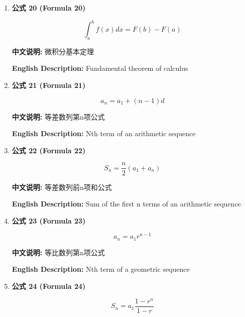 \documentclass[12pt,a4paper]{article}
\begin{document}
\begin{enumerate}[leftmargin=*]
\vspace{0.5cm}

\item \textbf{公式 20 (Formula 20)}

\begin{equation}
\int_a^b f(x)dx = F(b) - F(a)
\end{equation}

\textbf{中文说明:} 微积分基本定理

\textbf{English Description:} Fundamental theorem of calculus

\vspace{0.5cm}

\item \textbf{公式 21 (Formula 21)}

\begin{equation}
a_n = a_1 + (n-1)d
\end{equation}

\textbf{中文说明:} 等差数列第n项公式

\textbf{English Description:} Nth term of an arithmetic sequence

\vspace{0.5cm}

\item \textbf{公式 22 (Formula 22)}

\begin{equation}
S_n = \frac{n}{2}(a_1 + a_n)
\end{equation}

\textbf{中文说明:} 等差数列前n项和公式

\textbf{English Description:} Sum of the first n terms of an arithmetic sequence

\vspace{0.5cm}

\item \textbf{公式 23 (Formula 23)}

\begin{equation}
a_n = a_1 r^{n-1}
\end{equation}

\textbf{中文说明:} 等比数列第n项公式

\textbf{English Description:} Nth term of a geometric sequence

\vspace{0.5cm}

\item \textbf{公式 24 (Formula 24)}

\begin{equation}
S_n = a_1 \frac{1-r^n}{1-r}
\end{equation}


\end{enumerate}
\end{document}
